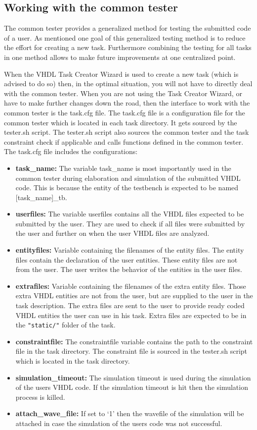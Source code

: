 \subsection{Working with the common tester} \label{sub:testercommon}

The common tester provides a generalized method for testing the submitted code of a user. As mentioned one goal of this generalized testing method is to reduce the effort for creating a new task. Furthermore combining the testing for all tasks in one method allows to make future improvements at one centralized point.

When the VHDL Task Creator Wizard is used to create a new task (which is advised to do so) then, in the optimal situation, you will not have to directly deal with the common tester. When you are not using the Task Creator Wizard, or have to make further changes down the road, then the interface to work with the common tester is the task.cfg file. The task.cfg file is a configuration file for the common tester which is located in each task directory. It gets sourced by the tester.sh script. The tester.sh script also sources the common tester and the task constraint check if applicable and calls functions defined in the common tester. The task.cfg file includes the configurations:
\begin{itemize}
\item {\bf task\_name:} The variable task\_name is most importantly used in the common tester during elaboration and simulation of the submitted VHDL code. This is because the entity of the testbench is expected to be named \mbox{[task\_name]\_tb}.
\item {\bf userfiles:} The variable userfiles contains all the VHDL files expected to be submitted by the user. They are used to check if all files were submitted by the user and further on when the user VHDL files are analyzed.
\item {\bf entityfiles:} Variable containing the filenames of the entity files. The entity files contain the declaration of the user entities. These entity files are not from the user. The user writes the behavior of the entities in the user files.
\item {\bf extrafiles:} Variable containing the filenames of the extra entity files. Those extra VHDL entities are not
from the user, but are supplied to the user in the task description. The extra files are sent to the user to provide
ready coded VHDL entities the user can use in his task. Extra files are expected to be in the {\tt "static/"} folder of
the task.
\item {\bf constraintfile:} The constraintfile variable contains the path to the constraint file in the task directory. The constraint file is sourced in the tester.sh script which is located in the task directory.
\item {\bf simulation\_timeout:} The simulation timeout is used during the simulation of the users VHDL code. If the simulation timeout is hit then the simulation process is killed.
\item {\bf attach\_wave\_file:} If set to `1' then the wavefile of the simulation will be attached in case the simulation of the users code was not successful.
\end{itemize}



